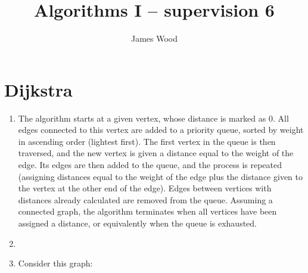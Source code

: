 \documentclass[11pt]{article}
\title{\textbf{Algorithms I -- supervision 6}}
\author{James Wood}
\begin{document}
\renewcommand{\labelenumi}{(\alph{enumi})}
\renewcommand{\labelenumii}{(\roman{enumii})}

\maketitle

\section{Dijkstra}
\begin{enumerate}
\item The algorithm starts at a given vertex, whose distance is marked as 0. All edges connected to this vertex are added to a priority queue, sorted by weight in ascending order (lightest first). The first vertex in the queue is then traversed, and the new vertex is given a distance equal to the weight of the edge. Its edges are then added to the queue, and the process is repeated (assigning distances equal to the weight of the edge plus the distance given to the vertex at the other end of the edge). Edges between vertices with distances already calculated are removed from the queue. Assuming a connected graph, the algorithm terminates when all vertices have been assigned a distance, or equivalently when the queue is exhausted.
\item
\item Consider this graph:



\end{enumerate}
\end{document}
